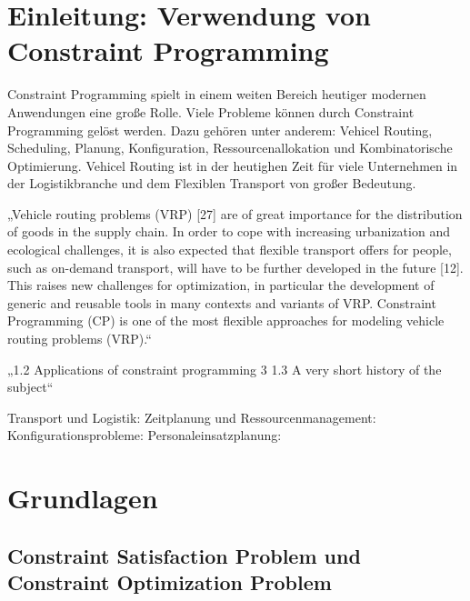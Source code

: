 




\tableofcontents

\clearpage
{}


\section{Einleitung: Verwendung von Constraint Programming}
\label{sec:Einleitung: Verwendung von Constraint Programming}
Constraint Programming spielt in einem weiten Bereich heutiger modernen
Anwendungen eine große Rolle. Viele Probleme können durch Constraint Programming
gelöst werden. Dazu gehören unter anderem: Vehicel Routing, Scheduling, Planung,
Konfiguration, Ressourcenallokation und Kombinatorische Optimierung. Vehicel
Routing ist in der heutighen Zeit für viele Unternehmen in der Logistikbranche
und dem Flexiblen Transport von großer Bedeutung. \cite[1]{delec22jo}

„Vehicle routing problems (VRP) [27] are of great importance for the
distribution of goods in the supply chain. In order to cope with increasing
urbanization and ecological challenges, it is also expected that flexible
transport offers for people, such as on-demand transport, will have to be
further developed in the future [12]. This raises new challenges for
optimization, in particular the development of generic and reusable tools in
many contexts and variants of VRP. Constraint Programming (CP) is one of the
most flexible approaches for modeling vehicle routing problems (VRP).“
\cite[text]{delec22jo}

„1.2 Applications of constraint programming 3 1.3 A very short history of the
subject“ \cite[6]{aptjo}


Transport und Logistik: Zeitplanung und Ressourcenmanagement:
Konfigurationsprobleme: Personaleinsatzplanung:

\cite[1-5]{rossi06bo}

\section{Grundlagen}
\subsection{Constraint Satisfaction Problem und Constraint Optimization Problem} 
\label{sec:Constraint Satisfaction Problem und Constraint Optimization Problem}



